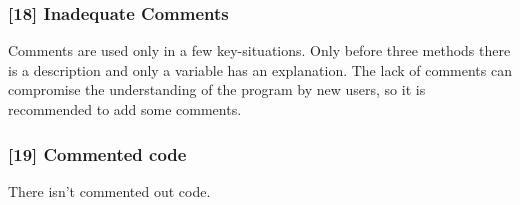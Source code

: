 \subsubsection{[18] Inadequate Comments}
Comments are used only in a few key-situations. Only before three methods there is a description and only a variable has an explanation. The lack of comments can compromise the understanding of the program by new users, so it is recommended to add some comments.

\subsubsection{[19] Commented code}
There isn't commented out code.
